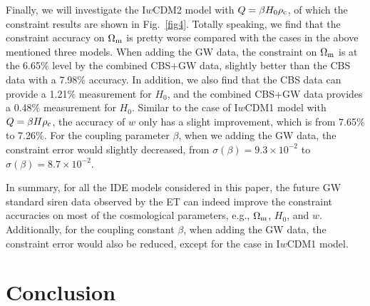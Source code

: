 \documentclass[aps,prd,nofootinbib,amsmath,amssymb,superscriptaddress,twocolumn,10pt]{revtex4}%
\begin{document}
Finally, we will investigate the I$w$CDM2 model with $Q=\beta H_{0}\rho_{\rm c}$, of which the constraint results are shown in Fig.~\ref{fig4}. Totally speaking, we find that the constraint accuracy on $\Omega_{\rm m}$ is pretty worse compared with the cases in the above mentioned three models. When adding the GW data, the constraint on $\Omega_{\rm m}$ is at the 6.65\% level by the combined CBS+GW data, slightly better than the CBS data with a 7.98\% accuracy. In addition, we also find that the CBS data can provide a 1.21\% measurement for $H_0$, and the combined CBS+GW data provides a 0.48\% measurement for $H_0$. Similar to the case of I$w$CDM1 model with $Q=\beta H\rho_{\rm c}$, the accuracy of $w$ only has a slight improvement, which is from 7.65\% to 7.26\%. For the coupling parameter $\beta$, when we adding the GW data, the constraint error would slightly decreased, from $\sigma(\beta)=9.3 \times 10^{-2}$ to $\sigma(\beta)=8.7 \times 10^{-2}$.

In summary, for all the IDE models considered in this paper, the future GW standard siren data observed by the ET can indeed improve the constraint accuracies on most of the cosmological parameters, e.g., $\Omega_{\rm m}$, $H_0$, and $w$. Additionally, for the coupling constant $\beta$, when adding the GW data, the constraint error would also be reduced, except for the case in I$w$CDM1 model.



\section{Conclusion}\label{sec5}
\end{document}
